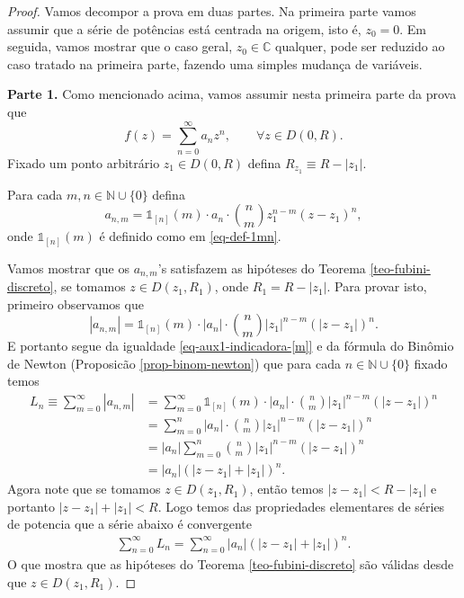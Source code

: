 \begin{proof}
Vamos decompor a prova em duas partes. Na primeira parte vamos assumir
que a série de potências está centrada na origem, isto é, $z_0=0$. 
Em seguida, vamos mostrar que o caso geral, $z_0\in\mathbb{C}$ qualquer, 
pode ser reduzido ao caso tratado na primeira parte, 
fazendo uma simples mudança de variáveis.

\bigskip 
\noindent\textbf {Parte 1.}
Como mencionado acima, vamos assumir nesta primeira parte da prova que 
\[
f(z) = \sum_{n=0}^{\infty} a_n z^n, \qquad \forall z\in D(0,R). 
\]
Fixado um ponto arbitrário $z_1\in D(0,R)$ defina $R_{z_1}\equiv R-|z_1|$.


\medskip 

Para cada $m,n\in \mathbb{N}\cup\{0\}$ defina
\[
a_{n,m} = \mathds{1}_{[n]}(m) \cdot a_n \cdot \binom{n}{m} z_1^{n-m}(z-z_1)^{n}, 
\]
onde $\mathds{1}_{[n]}(m)$ é definido como em \eqref{eq-def-1mn}.


Vamos mostrar que os $a_{n,m}$'s satisfazem as hipóteses 
do Teorema \ref{teo-fubini-discreto}, se tomamos $z\in D(z_1,R_{1})$,
onde $R_1=R-|z_1|$. 
Para provar isto, primeiro observamos que 
\[
|a_{n,m}| 
= 
\mathds{1}_{[n]}(m) \cdot |a_n| \cdot \binom{n}{m} |z_1|^{n-m}(|z-z_1|)^{n}. 
\]
E portanto segue da igualdade \eqref{eq-aux1-indicadora-[m]} e da fórmula do Binômio
de Newton (Proposicão \ref{prop-binom-newton}) que para cada  $n\in \mathbb{N}\cup\{0\}$
fixado temos
\begin{align*}
L_n 
\equiv 
\sum_{m=0}^{\infty}|a_{n,m}| 
&=
\sum_{m=0}^{\infty}\mathds{1}_{[n]}(m) \cdot |a_n| \cdot \binom{n}{m} |z_1|^{n-m}(|z-z_1|)^{n} 
\\
&=
\sum_{m=0}^{n} |a_n| \cdot \binom{n}{m} |z_1|^{n-m}(|z-z_1|)^{n} 
\\
&=
|a_n| \sum_{m=0}^{n} \binom{n}{m} |z_1|^{n-m}(|z-z_1|)^{n} 
\\
&=
|a_n| (|z-z_1|+|z_1|)^{n}. 
\end{align*}
Agora note que se tomamos $z\in D(z_1,R_{1})$, então temos $|z-z_1|<R-|z_1|$ e portanto 
$|z-z_1|+|z_1|<R$. Logo temos das propriedades elementares de séries de potencia 
que a série abaixo é convergente
\begin{align*}
\sum_{n=0}^{\infty} L_n = \sum_{n=0}^{\infty} |a_n| (|z-z_1|+|z_1|)^{n}.
\end{align*}
O que mostra que as hipóteses do Teorema \ref{teo-fubini-discreto} são
válidas desde que $z\in D(z_1,R_{1})$. 


\end{proof}
